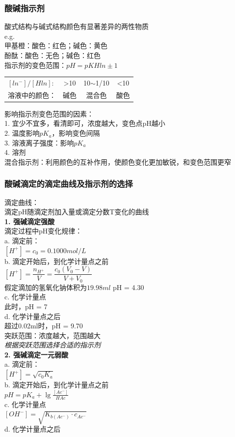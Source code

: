 \documentclass[utf8,a4paper,12pt]{ctexart}
\begin{document}
\subsubsection{酸碱指示剂}
酸式结构与碱式结构颜色有显著差异的两性物质\\
e.g.\\
{\kaishu
甲基橙：酸色：红色；碱色：黄色\\
酚酞：酸色：无色；碱色：红色\\}
指示剂的变色范围：$pH = pKHln \pm 1$\\
\begin{table}[H]
\centering
\begin{tabular}{lccc}
$[ln^-]/[Hln]:$& >10 & 10$\sim$1/10 & <10\\
溶液中的颜色：& 碱色 & 混合色 & 酸色
\end{tabular}
\end{table}
影响指示剂变色范围的因素：\\
1. 宜少不宜多，看清即可，浓度越大，变色点pH越小\\
2. 温度影响$pK_a$，影响变色间隔\\
3. 溶液离子强度：影响$pK_a$\\
4. 溶剂\\
混合指示剂：利用颜色的互补作用，使颜色变化更加敏锐，和变色范围更窄\\
\subsubsection{酸碱滴定的滴定曲线及指示剂的选择}
滴定曲线：\\
滴定pH随滴定剂加入量或滴定分数T变化的曲线\\
{\bf 1. 强碱滴定强酸}\\
滴定过程中pH变化规律：\\
a. 滴定前：\\
$[H^+] = c_0 = 0.1000mol/L$\\
b. 滴定开始后，到化学计量点之前\\
$[H^+] = \dfrac{n_{H^+}}{V} = \dfrac{c_0(V_0 - V)}{V + V_0}$\\
假定滴加的氢氧化钠体积为$19.98ml$  pH = 4.30\\
c. 化学计量点\\
此时，pH = 7\\
d. 化学计量点之后\\
超过0.02ml时，pH = 9.70\\
突跃范围：浓度越大，范围越大\\
\emph{根据突跃范围选择合适的指示剂}\\
{\bf 2. 强碱滴定一元弱酸}\\
a. 滴定前：\\
$[H^+] = \sqrt{c_0K_a}$\\
b. 滴定开始后，到化学计量点之前\\
$pH = pK_a + \lg\frac{[Ac^-]}{HAc}$\\
c. 化学计量点\\
$[OH^-] = \sqrt{K_{b(Ac^-)}\cdot c_{Ac^-}}$\\
d. 化学计量点之后\\
\end{document}
